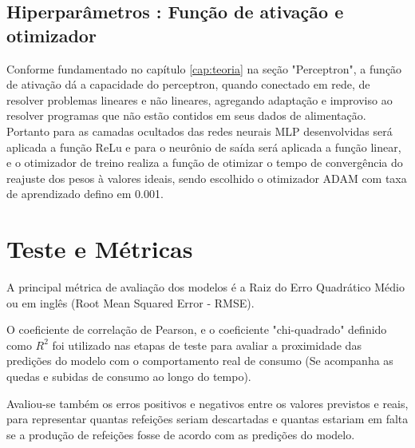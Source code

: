 	\subsection{Hiperparâmetros : Função de ativação e otimizador}
        Conforme fundamentado no capítulo \ref{cap:teoria} na seção "Perceptron", a função de ativação dá a capacidade do perceptron, quando conectado em rede, de resolver problemas lineares e não lineares, agregando adaptação e improviso ao resolver programas que não estão contidos em seus dados de alimentação.
        Portanto para as camadas ocultados das redes neurais MLP desenvolvidas será aplicada a função ReLu e para o neurônio de saída será aplicada a função linear, e o otimizador de treino realiza a função de otimizar o tempo de convergência do reajuste dos pesos à valores ideais, sendo escolhido o otimizador ADAM com taxa de aprendizado defino em 0.001.

    \section{Teste e Métricas}
       A principal métrica de avaliação dos modelos é a Raiz do Erro Quadrático Médio ou em inglês (Root Mean Squared Error - RMSE).
       
        O coeficiente de correlação de Pearson, e o coeficiente "chi-quadrado" definido como $R^2$ foi utilizado nas etapas de teste para avaliar a proximidade das predições do modelo com o comportamento real de consumo (Se acompanha as quedas e subidas de consumo ao longo do tempo).\newline
       
       
       
       Avaliou-se também os erros positivos e negativos entre os valores previstos e reais, para representar quantas refeições seriam descartadas e quantas estariam em falta se a produção de refeições fosse de acordo com as predições do modelo.
       
